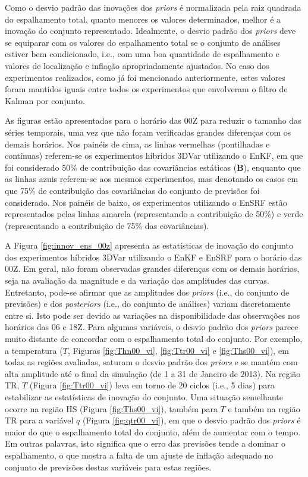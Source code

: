Como o desvio padrão das inovações dos \textit{priors} é normalizada pela raiz quadrada do espalhamento total, quanto menores os valores determinados, melhor é a inovação do conjunto representado. Idealmente, o desvio padrão dos \textit{priors} deve se equiparar com os valores do espalhamento total se o conjunto de análises estiver bem condicionado, i.e., com uma boa quantidade de espalhamento e valores de localização e inflação apropriadamente ajustados. No caso dos experimentos realizados, como já foi mencionado anteriormente, estes valores foram mantidos iguais entre todos os experimentos que envolveram o filtro de Kalman por conjunto.

As figuras estão apresentadas para o horário das 00Z para reduzir o tamanho das séries temporais, uma vez que não foram verificadas grandes diferenças com os demais horários. Nos painéis de cima, as linhas vermelhas (pontilhadas e contínuas) referem-se os experimentos híbridos 3DVar utilizando o EnKF, em que foi considerado 50\% de contribuição das covariâncias estáticas ($\mathbf{B}$), enquanto que as linhas azuis referem-se aos mesmos experimentos, mas denotando os casos em que 75\% de contribuição das covariâncias do conjunto de previsões foi considerado. Nos painéis de baixo, os experimentos utilizando o EnSRF estão representados pelas linhas amarela (representando a contribuição de 50\%) e verde (representando a contribuição de 75\% das covariâncias).

A Figura \ref{fig:innov_ens_00z} apresenta as estatísticas de inovação do conjunto dos experimentos híbridos 3DVar utilizando o EnKF e EnSRF para o horário das 00Z. Em geral, não foram observadas grandes diferenças com os demais horários, seja na avaliação da magnitude e da variação das amplitudes das curvas. Entretanto, pode-se afirmar que as amplitudes dos \textit{priors} (i.e., do conjunto de previsões) e dos \textit{posteriors} (i.e., do conjunto de análises) variam discretamente entre si. Isto pode ser devido as variações na disponibilidade das observações nos horários das 06 e 18Z. Para algumas variáveis, o desvio padrão dos \textit{priors} parece muito distante de concordar com o espalhamento total do conjunto. Por exemplo, a temperatura ($T$, Figuras \ref{fig:Thn00_vi}, \ref{fig:Ttr00_vi} e \ref{fig:Ths00_vi}), em todas as regiões avaliadas, saturam o desvio padrão dos \textit{priors} e se mantém com alta amplitude até o final da simulação (de 1 a 31 de Janeiro de 2013). Na região TR, $T$ (Figura \ref{fig:Ttr00_vi}) leva em torno de 20 ciclos (i.e., 5 dias) para estabilizar as estatísticas de inovação do conjunto. Uma situação semelhante ocorre na região HS (Figura \ref{fig:Ths00_vi}), também para $T$ e também na região TR para a variável $q$ (Figura \ref{fig:qtr00_vi}), em que o desvio padrão dos \textit{priors} é maior do que o espalhamento total do conjunto, além de aumentar com o tempo. Em outras palavras, isto significa que o erro das previsões tende a dominar o espalhamento, o que mostra a falta de um ajuste de inflação adequado no conjunto de previsões destas variáveis para estas regiões.

